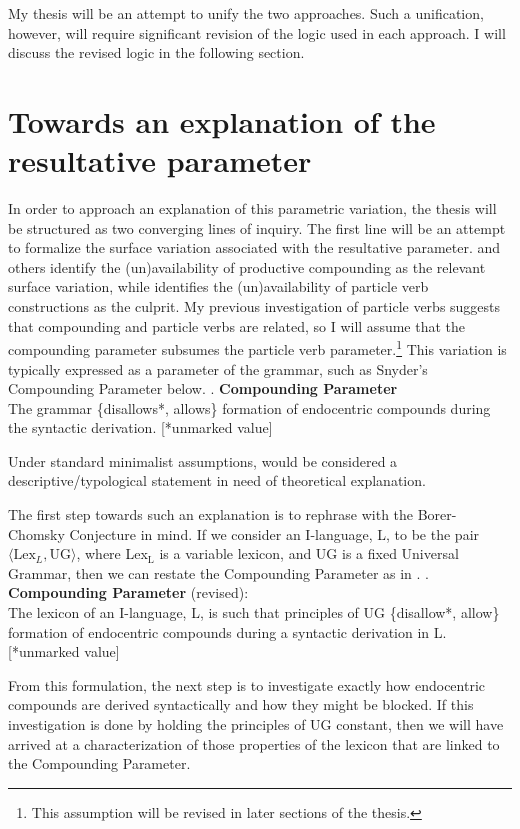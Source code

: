 \documentclass[letterpaper,12pt]{article}
\begin{document}
My thesis will be an attempt to unify the two approaches. 
Such a unification, however, will require significant revision of the logic used in each approach.
I will discuss the revised logic in the following section.


\section{Towards an explanation of the resultative parameter}\label{sec:outline}
In order to approach an explanation of this parametric variation, the thesis will be structured as two converging lines of inquiry.
The first line will be an attempt to formalize the surface variation associated with the resultative parameter.
\textcite{snyder2001nature,roeper2002learnability,kratzer_building_2004} and others identify the (un)availability of productive compounding as the relevant surface variation, while \textcite{haider2016predicting} identifies the (un)availability of particle verb constructions as the culprit.
My previous investigation of particle verbs \parencite[][included as an appendix]{milway2013forum} suggests that compounding and particle verbs are related, so I will assume that the compounding parameter subsumes the particle verb parameter.\footnote{
  This assumption will be revised in later sections of the thesis.
}
This variation is typically expressed as a parameter of the grammar, such as Snyder's Compounding Parameter below.
\ex. \textbf{Compounding Parameter} \parencite{snyder2001nature}\\ 
The grammar \{disallows*, allows\} formation of endocentric compounds during the syntactic derivation. [*unmarked value] 

Under standard minimalist assumptions, \Last would be considered a descriptive/typological statement in need of theoretical explanation.

The first step towards such an explanation is to rephrase \Last with the Borer-Chomsky Conjecture in mind.
If we consider an I-language, L, to be the pair $\langle\text{Lex}_L, \text{UG}\rangle$, where Lex$_\text{L}$ is a variable lexicon, and UG is a fixed Universal Grammar, then we can restate the Compounding Parameter as in \Next.
\ex. \textbf{Compounding Parameter} (revised):\\
The lexicon of an I-language, L, is such that principles of UG \{disallow*, allow\} formation of endocentric compounds during a syntactic derivation in L. [*unmarked value]

From this formulation, the next step is to investigate exactly how endocentric compounds are derived syntactically and how they might be blocked.
If this investigation is done by holding the principles of UG constant, then we will have arrived at a characterization of those properties of the lexicon that are linked to the Compounding Parameter.
\end{document}

